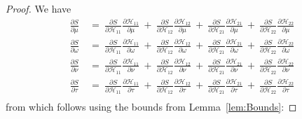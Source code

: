 \documentclass{article}
\begin{document}
\begin{proof}
We have
\begin{align}
\frac{\partial S}{\partial \mu} \ &= \ 
\frac{\partial S}{\partial {\mathcal H}_{11}}
\frac{\partial {\mathcal H}_{11}}{\partial \mu} \ + \
\frac{\partial S}{\partial {\mathcal H}_{12}}
\frac{\partial {\mathcal H}_{12}}{\partial \mu} \ + \
\frac{\partial S}{\partial {\mathcal H}_{21}}
\frac{\partial {\mathcal H}_{21}}{\partial \mu} \ + \
\frac{\partial S}{\partial {\mathcal H}_{22}}
\frac{\partial {\mathcal H}_{22}}{\partial \mu} \\
\frac{\partial S}{\partial \omega} \ &= \ 
\frac{\partial S}{\partial {\mathcal H}_{11}}
\frac{\partial {\mathcal H}_{11}}{\partial \omega} \ + \
\frac{\partial S}{\partial {\mathcal H}_{12}}
\frac{\partial {\mathcal H}_{12}}{\partial \omega} \ + \
\frac{\partial S}{\partial {\mathcal H}_{21}}
\frac{\partial {\mathcal H}_{21}}{\partial \omega} \ + \
\frac{\partial S}{\partial {\mathcal H}_{22}}
\frac{\partial {\mathcal H}_{22}}{\partial \omega} \\
\frac{\partial S}{\partial \nu} \ &= \ 
\frac{\partial S}{\partial {\mathcal H}_{11}}
\frac{\partial {\mathcal H}_{11}}{\partial \nu} \ + \
\frac{\partial S}{\partial {\mathcal H}_{12}}
\frac{\partial {\mathcal H}_{12}}{\partial \nu} \ + \
\frac{\partial S}{\partial {\mathcal H}_{21}}
\frac{\partial {\mathcal H}_{21}}{\partial \nu} \ + \
\frac{\partial S}{\partial {\mathcal H}_{22}}
\frac{\partial {\mathcal H}_{22}}{\partial \nu} \\
\frac{\partial S}{\partial \tau} \ &= \ 
\frac{\partial S}{\partial {\mathcal H}_{11}}
\frac{\partial {\mathcal H}_{11}}{\partial \tau} \ + \
\frac{\partial S}{\partial {\mathcal H}_{12}}
\frac{\partial {\mathcal H}_{12}}{\partial \tau} \ + \
\frac{\partial S}{\partial {\mathcal H}_{21}}
\frac{\partial {\mathcal H}_{21}}{\partial \tau} \ + \
\frac{\partial S}{\partial {\mathcal H}_{22}}
\frac{\partial {\mathcal H}_{22}}{\partial \tau} \\
\end{align}
from which follows using the bounds from Lemma~\ref{lem:Bounds}:


\end{proof}
\end{document}
